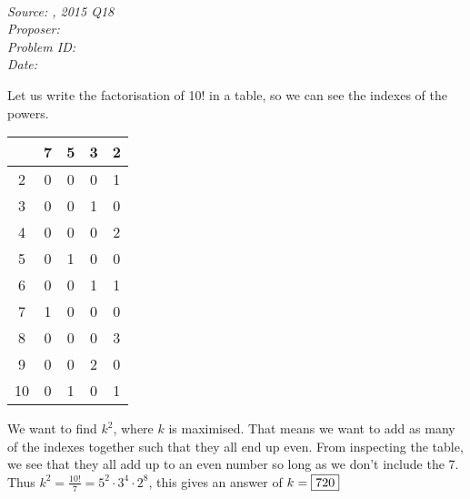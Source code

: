 \SSbreak\\
\emph{Source: \Csmc, 2015 Q18}\\
\emph{Proposer: \Pss}\\
\emph{Problem ID: }\\
\emph{Date: }\\
\SSbreak

\bigskip

\begin{solution}\hfil\medskip
Let us write the factorisation of 10! in a table, so we can see  the indexes of the powers.

	\begin{table}[h!]
		\centering
		\begin{tabular}{c|cccc}
		   & 7 & 5 & 3 & 2 \\ \hline
		2  & 0 & 0 & 0 & 1 \\
		3  & 0 & 0 & 1 & 0 \\
		4  & 0 & 0 & 0 & 2 \\
		5  & 0 & 1 & 0 & 0 \\
		6  & 0 & 0 & 1 & 1 \\
		7  & 1 & 0 & 0 & 0 \\
		8  & 0 & 0 & 0 & 3 \\
		9  & 0 & 0 & 2 & 0 \\
		10 & 0 & 1 & 0 & 1
		\end{tabular}
		\end{table}

We want to find \(k^2\), where \(k\) is maximised. That means we want to add as many of the indexes together such that they all end up even. From inspecting the table, we see that they all add up to an even number so long as we don't include the 7. Thus \(k^2=\frac{10!}{7}=5^2\cdot3^4\cdot2^8\), this gives an answer of \(k=\fbox{720}\)
\end{solution}\bigskip
